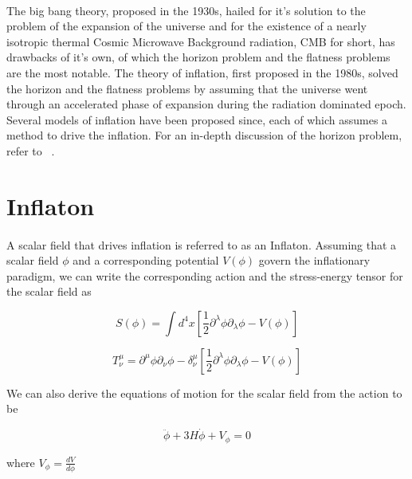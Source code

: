 \documentclass[12pt,a4paper,oneside]{book}
\begin{document}
\paragraph*{} The big bang theory, proposed in the 1930s, hailed for it's solution to the problem of the expansion of the universe and for the existence of a nearly isotropic thermal Cosmic Microwave Background radiation, CMB for short, has drawbacks of it's own, of which the horizon problem and the flatness problems are the most notable. The theory of inflation, first proposed in the 1980s, solved the horizon and the flatness problems by assuming that the universe went through an accelerated phase of expansion during the radiation dominated epoch. Several models of inflation have been proposed since, each of which assumes a method to drive the inflation. For an in-depth discussion of the horizon problem, refer to ~\cite{Sriramkumar L - 2009}.

\section{Inflaton}

\paragraph*{} A scalar field that drives inflation is referred to as an Inflaton. Assuming that a scalar field $\phi$ and a corresponding potential $V(\phi)$ govern the inflationary paradigm, we can write the corresponding action and the stress-energy tensor for the scalar field as

\begin{equation}
S(\phi) = \int d^4x[\frac{1}{2}\partial^{\lambda}\phi \partial_{\lambda}\phi - V(\phi)]
\end{equation}

\begin{equation}
T^{\mu}_{\nu} = \partial^{\mu}\phi \partial_{\nu}\phi -\delta^{\mu}_{\nu}[\frac{1}{2}\partial^{\lambda}\phi \partial_{\lambda}\phi - V(\phi)]
\end{equation}

\noindent We can also derive the equations of motion for the scalar field from the action to be

\begin{equation}
\ddot{\phi} + 3H\dot{\phi} + V_{\phi} = 0
\end{equation}

\noindent where $V_{\phi} = \frac{dV}{d\phi}$
\end{document}
